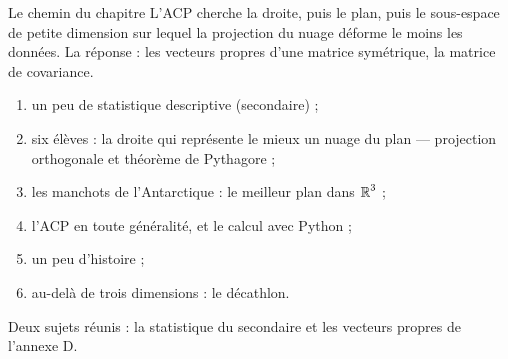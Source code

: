 \begin{frame}{Le chemin du chapitre}
  L'ACP cherche la droite, puis le plan, puis le sous-espace de petite
  dimension sur lequel la projection du nuage déforme le moins les données.
  La réponse : les vecteurs propres d'une matrice symétrique, la matrice
  de covariance.
  \vspace{6pt}
  \begin{enumerate}
    \item un peu de statistique descriptive (secondaire) ;
    \item six élèves : la droite qui représente le mieux un nuage du plan
      --- projection orthogonale et théorème de Pythagore ;
    \item les manchots de l'Antarctique : le meilleur plan dans $\operatorname{\mathbb{R}}^3$ ;
    \item l'ACP en toute généralité, et le calcul avec Python ;
    \item un peu d'histoire ;
    \item au-delà de trois dimensions : le décathlon.
  \end{enumerate}
  \vspace{4pt}
  Deux sujets réunis : la statistique du secondaire et les vecteurs
  propres de l'annexe D.
\end{frame}
